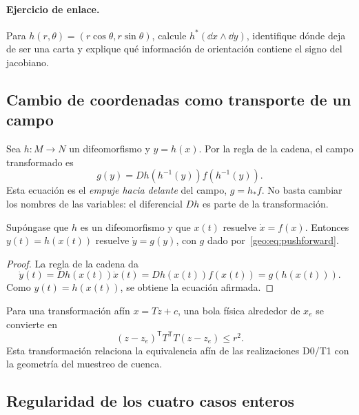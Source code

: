 \ifHAFOPedagogy
\paragraph{Ejercicio de enlace.}
Para \(h(r,\theta)=(r\cos\theta,r\sin\theta)\), calcule
\(h^*(\dd x\wedge\dd y)\), identifique dónde deja de ser una carta y explique
qué información de orientación contiene el signo del jacobiano.
\fi

\subsection{Cambio de coordenadas como transporte de un campo}

Sea \(h:M\to N\) un difeomorfismo y \(y=h(x)\). Por la regla de la cadena,
el campo transformado es
\begin{equation}
  g(y)=D h(h^{-1}(y))f(h^{-1}(y)).
  \label{geo:eq:pushforward}
\end{equation}
Esta ecuación es el \emph{empuje hacia delante} del campo, \(g=h_*f\). No
basta cambiar los nombres de las variables: el diferencial \(Dh\) es parte de
la transformación.

\begin{proposition}
Supóngase que \(h\) es un difeomorfismo y que \(x(t)\) resuelve
\(\dot x=f(x)\). Entonces \(y(t)=h(x(t))\) resuelve
\(\dot y=g(y)\), con \(g\) dado por~\eqref{geo:eq:pushforward}.
\end{proposition}

\begin{proof}
La regla de la cadena da
\[
 \dot y(t)=Dh(x(t))\dot x(t)=Dh(x(t))f(x(t))=g(h(x(t))).
\]
Como \(y(t)=h(x(t))\), se obtiene la ecuación afirmada.
\end{proof}

Para una transformación afín \(x=Tz+c\), una bola física alrededor de
\(x_e\) se convierte en
\begin{equation}
 (z-z_e)^{\mathsf T}T^{\mathsf T}T(z-z_e)\le r^2.
 \label{geo:eq:ball-to-ellipsoid}
\end{equation}
Esta transformación relaciona la equivalencia afín de las realizaciones D0/T1
con la geometría del muestreo de cuenca.

\subsection{Regularidad de los cuatro casos enteros}

